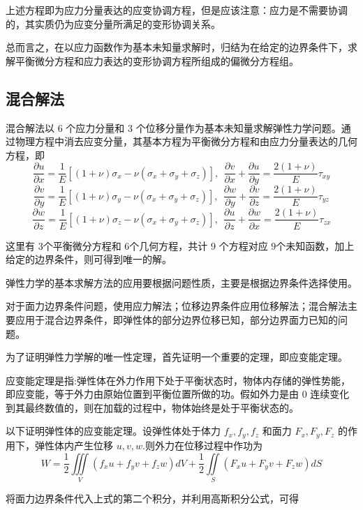 \documentclass[12pt,a4paper]{article}
\begin{document}
上述方程即为应力分量表达的应变协调方程，但是应该注意：应力是不需要协调的，其实质仍为应变分量所满足的变形协调关系。

总而言之，在以应力函数作为基本未知量求解时，归结为在给定的边界条件下，求解平衡微分方程和应力表达的变形协调方程所组成的偏微分方程组。

\subsection{混合解法}

混合解法以 $6$ 个应力分量和 $3$ 个位移分量作为基本未知量求解弹性力学问题。通过物理方程中消去应变分量，其基本方程为平衡微分方程和由应力分量表达的几何方程，即
$$
\frac{\partial u}{\partial x}=\frac{1}{E}\left[(1+\nu)\sigma_x-\nu(\sigma_x+\sigma_y+\sigma_z)\right], ~~ \frac{\partial v}{\partial x}+\frac{\partial u}{\partial y}=\frac{2(1+\nu)}{E}\tau_{xy}
$$
$$
\frac{\partial v}{\partial y}=\frac{1}{E}\left[(1+\nu)\sigma_y-\nu(\sigma_x+\sigma_y+\sigma_z)\right], ~~ \frac{\partial w}{\partial y}+\frac{\partial v}{\partial z}=\frac{2(1+\nu)}{E}\tau_{yz}
$$
$$
\frac{\partial w}{\partial z}=\frac{1}{E}\left[(1+\nu)\sigma_z-\nu(\sigma_x+\sigma_y+\sigma_z)\right], ~~ \frac{\partial u}{\partial z}+\frac{\partial w}{\partial x}=\frac{2(1+\nu)}{E}\tau_{zx}
$$

这里有 $3$个平衡微分方程和 $6$个几何方程，共计 $9$ 个方程对应 $9$个未知函数，加上给定的边界条件，则可得到唯一的解。

弹性力学的基本求解方法的应用要根据问题性质，主要是根据边界条件选择使用。

对于面力边界条件问题，使用应力解法；位移边界条件应用位移解法；混合解法主要应用于混合边界条件，即弹性体的部分边界位移已知，部分边界面力已知的问题。


为了证明弹性力学解的唯一性定理，首先证明一个重要的定理，即应变能定理。

应变能定理是指:弹性体在外力作用下处于平衡状态时，物体内存储的弹性势能，即应变能，等于外力由原始位置到平衡位置所做的功。假如外力是由 $0$ 连续变化到其最终数值的，则在加载的过程中，物体始终是处于平衡状态的。

以下证明弹性体的应变能定理。设弹性体处于体力 $f_x, f_y, f_z$ 和面力 $F_x, F_y, F_z$ 的作用下，弹性体内产生位移 $u,v,w$.则外力在位移过程中作功为
$$
W=\frac{1}{2}\iiint\limits_V (f_x u+f_y v+f_z w)dV+\frac{1}{2}\iint\limits_S (F_x u+F_y v+F_z w)dS
$$

将面力边界条件代入上式的第二个积分，并利用高斯积分公式，可得
\end{document}
